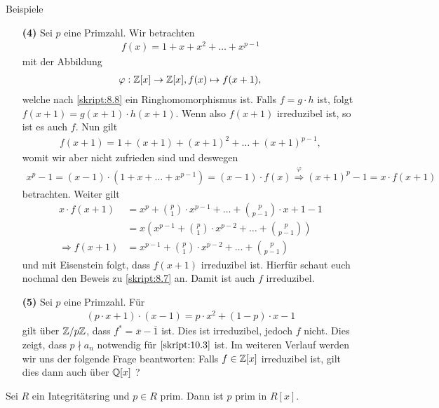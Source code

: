 \begin{genericdf}{Beispiele}
\begin{enumerate}
		\item[\textbf{(4)}]
		Sei $ p $ eine Primzahl. Wir betrachten
		\begin{align*}
		f(x) = 1 + x + x^2 + \dots + x^{p-1}
		\end{align*}
		mit der Abbildung
		\begin{align*}
		\varphi : \mathbb{Z}[x] \to \mathbb{Z}[x], f(x) \mapsto f(x+1),
		\end{align*}
		welche nach \ref{skript:8.8} ein Ringhomomorphismus ist.
		Falls $ f = g \cdot h $ ist, folgt $ f(x+1) = g(x+1) \cdot h(x+1) $.
		Wenn also $ f(x+1) $ irreduzibel ist, so ist es auch $ f $.
		Nun gilt 
		\begin{align*}
		f(x+1) = 1 + (x+1) + (x+1)^2 + \dots + (x+1)^{p-1},
		\end{align*}
		womit wir aber nicht zufrieden sind und deswegen
		\begin{align*}
		x^p  - 1 = (x-1) \cdot (1 + x + \dots + x^{p-1}) = (x-1) \cdot f(x)
		\stackrel{\varphi}{\Rightarrow}
		(x+1)^p -1 = x \cdot f(x+1)
		\end{align*}
		betrachten. Weiter gilt
		\begin{align*}
		x \cdot f(x+1) &= x^p + \binom{p}{1} \cdot x^{p-1} + \dots + \binom{p}{p-1} \cdot x + 1 - 1 \\
				&= x \left( x^{p-1} + \binom{p}{1} \cdot x^{p-2} + \dots + \binom{p}{p-1} \right)\\
		\Rightarrow
		f(x+1) &= x^{p-1} + \binom{p}{1} \cdot x^{p-2} + \dots + \binom{p}{p-1} 
		\end{align*}
		und mit Eisenstein folgt, dass $ f(x+1) $ irreduzibel ist.
		Hierfür schaut euch nochmal den Beweis zu \ref{skript:8.7} an. 
		Damit ist auch $ f $ irreduzibel.
		
		\item[\textbf{(5)}]
		Sei $ p  $ eine Primzahl. Für
		\begin{align*}
		(p \cdot x + 1) \cdot (x-1) = p \cdot x^2 + (1-p) \cdot x - 1
		\end{align*}
		gilt über $ \mathbb{Z} / p \mathbb{Z} $, dass $ f^\ast  = \overline{x} - \overline{1} $ ist.
		Dies ist irreduzibel, jedoch $ f $ nicht.
		Dies zeigt, dass $ p \nmid a_n $ notwendig für $ \ref{skript:10.3} $ ist.
		Im weiteren Verlauf werden wir uns der folgende Frage beantworten:
		Falls $ f \in \mathbb{Z}[x] $ irreduzibel ist, gilt dies dann auch über $ \mathbb{Q}[x] $ ?
	\end{enumerate}
\end{genericdf}

\begin{lemma}\label{skript:10.6}
	Sei $ R $ ein Integritätsring und $ p \in R $ prim.
	Dann ist $ p $ prim in $ R[x] $.
\end{lemma}

